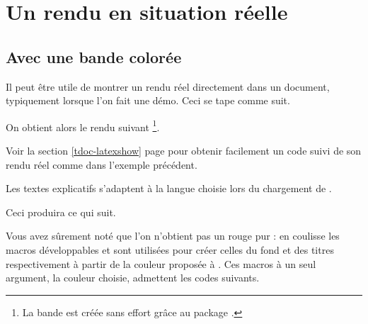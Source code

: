 \documentclass[10pt, a4paper]{article}
\begin{document}
\section{Un rendu en situation réelle} \label{tdoc-showcase}

\subsection{Avec une bande colorée}

\begin{tdocexa}
    Il peut être utile de montrer un rendu réel directement dans un document, typiquement lorsque l'on fait une démo.
    Ceci se tape comme suit.


    On obtient alors le rendu suivant
    \footnote{
        La bande est créée sans effort grâce au package .
    }.

    \medskip

    
\end{tdocexa}


\begin{tdocrem}
    Voir la section \ref{tdoc-latexshow} page \pageref{tdoc-latexshow} pour obtenir facilement un code suivi de son rendu réel comme dans l'exemple précédent.
\end{tdocrem}

\begin{tdocnote}
    Les textes explicatifs s'adaptent à la langue choisie lors du chargement de .
\end{tdocnote}




\begin{tdocexa}
    \leavevmode


    Ceci produira ce qui suit.

    \medskip

    
\end{tdocexa}


\begin{tdocnote}
    Vous avez sûrement noté que l'on n'obtient pas un rouge pur : en coulisse les macros développables  et  sont utilisées pour créer celles du fond et des titres respectivement à partir de la couleur proposée à .
	Ces macros à un seul argument, la couleur choisie, admettent les codes suivants.

	\begin{tdoclatex}[code]
	\end{tdoclatex}
\end{tdocnote}
\end{document}
